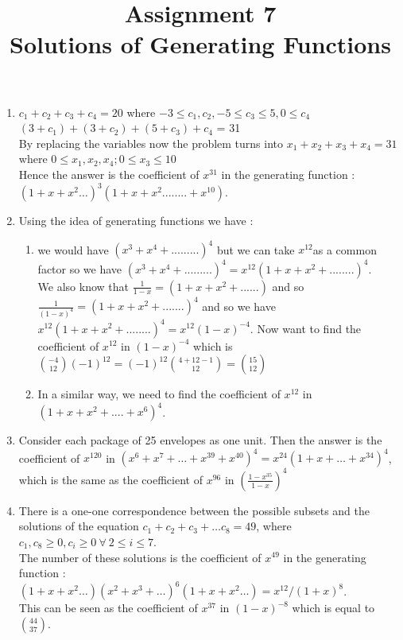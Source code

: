 \documentclass[a4paper]{article}
\title{Assignment 7\\ Solutions of Generating Functions}
\date{}
\begin{document}
\maketitle
\begin{enumerate}

\item  $c_1+c_2+c_3+ c_4=20$  where  $-3\leq  c_1, c_2,   -5\leq c_3\leq 5 ,0\leq c_4$\\
$(3+c_1)+(3+c_2)+(5+c_3)+c_4$ = 31\\
By replacing the variables  
 now the problem turns into $x_1+x_2+x_3+x_4=31 $ where $0\leq x_1,x_2,x_4; 0\leq x_3\leq 10$ \\
Hence the answer is the 	coefficient of $ x^{31} $ in the generating function :\\ 
$(1+x+x^2 \dots)^3(1+x+ x^2........+x^{10}).$


\item Using the idea of generating functions we have :
\begin{enumerate}

\item we would have $ (x^3+x^4+.........)^4 $ but we can take $  x^{12} $as a common factor so we have $ (x^3+x^4+.........)^4=  x^{12}(1+x+x^2+........)^4$.\\ 
We also know that $ \frac{1}{1-x} = (1+x+x^2+......)$ and so $\frac{1}{(1-x)^4} = (1+x+x^2+.......)^4 $
and so we have $x^{12}(1+x + x^2 + ........)^4 = x^{12}(1-x)^{-4}$. 
Now want to find the coefficient of $x^{12}$ in $(1−x)^{−4}$ which is ${-4 \choose 12}(-1)^{12} = (-1)^{12} {4 + 12 -1 \choose 12} = {15 \choose 12}$ 

\item In a similar way, we need to find the coefficient of $x^{12}$ in $(1 + x + x^2 + .... + x^6)^4$.
\end{enumerate}

\item Consider each package of 25 envelopes as one unit. Then the answer is the
	coefficient of 
	$x^{120}$ in  $(x^6 + x^7+ \dots + x^{39} + x^{40})^4 = x^{24}(1 + x +\dots + x^{34})^4$,  which 
	is the same as the coefficient of $x^{96}$ in
	$(\frac{1-x^{35}}{1-x})^4$
	
\item There is a one-one correspondence between the possible subsets and the solutions of the equation $ c_1+c_2+c_3+ \dots c_8=49$, where $c_1,c_8 \geq 0, c_i \geq 0 ~ \forall~ 2 \leq i \leq 7$. \\
The number of these solutions is the coefficient of $x^{49}$ in the generating function : \\
$(1+x+x^2 \dots)(x^2+x^3+ \dots)^6(1+x+x^2 \dots) = x^{12}/(1+x)^8$. \\
This can be seen as the coefficient of $x^37$ in $(1-x)^{-8}$ which is equal to $44 \choose 37$.


\end{enumerate}
\end{document}
